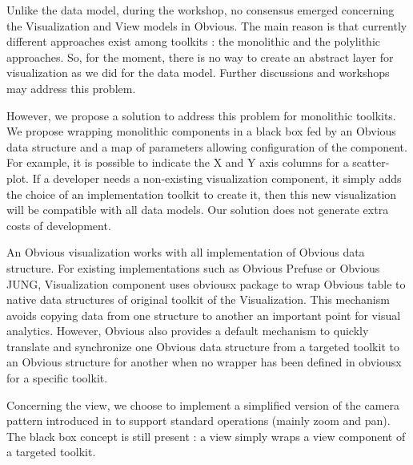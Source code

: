 Unlike the data model, during the workshop, no consensus emerged concerning the Visualization and View models in Obvious. The main reason is that currently different approaches exist among toolkits : the monolithic and the polylithic approaches. So, for the moment, there is no way to create an abstract layer for visualization as we did for the data model. Further discussions and workshops may address this problem.

However, we propose a solution to address this problem for monolithic toolkits. We propose wrapping monolithic components in a black box fed by an Obvious data structure and a map of parameters allowing configuration of the component. For example, it is possible to indicate the X and Y axis columns for a scatter-plot. If a developer needs a non-existing visualization component, it simply adds the choice of an implementation toolkit to create it, then this new visualization will be compatible with all data models. Our solution does not generate extra costs of development.


An Obvious visualization works with all implementation of Obvious data structure. For existing implementations such as Obvious Prefuse or Obvious JUNG, Visualization component uses obviousx package to wrap Obvious table to native data structures of original toolkit of the Visualization. This mechanism avoids copying data from one structure to another an important point for visual analytics. However, Obvious also provides a default mechanism to quickly translate and synchronize one Obvious data structure from a targeted toolkit to an Obvious structure for another when no wrapper has been defined in obviousx for a specific toolkit.

Concerning the view, we choose to implement a simplified version of the camera pattern introduced in \cite{DesignPatternsIV} to support standard operations (mainly zoom and pan). The black box concept is still present : a view simply wraps a view component of a targeted toolkit.

